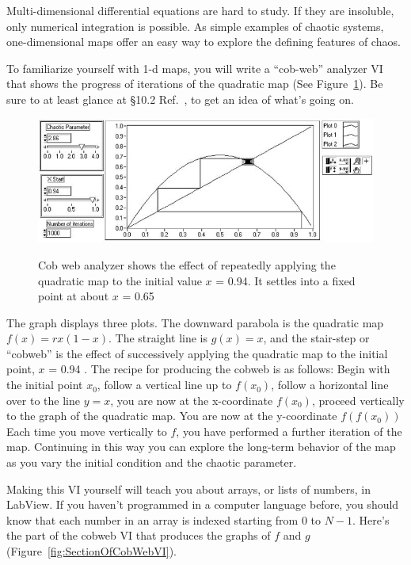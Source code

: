 \documentclass{../lab}
\begin{document}
Multi-dimensional differential equations are hard to study. If they are insoluble, only numerical integration is possible. As simple examples of chaotic systems, one-dimensional maps offer an easy way to explore the defining features of chaos.

To familiarize yourself with 1-d maps, you will write a ``cob-web'' analyzer VI that shows the progress of iterations of the quadratic map (See Figure~\ref{fig:CobWebAnalyzer}). Be sure to at least glance at \S10.2 Ref.~\cite{Strogatz}, to get an idea of what's going on.

\begin{figure}[h]
    \centering
    \href{http://experimentationlab.berkeley.edu/sites/default/files/images/Nldimage070.jpg}{\includegraphics[width=0.65\linewidth]{images/Nldimage070.jpg}}
    \caption{Cob web analyzer shows the effect of repeatedly applying the quadratic map to the initial value $x$ = 0.94. It settles into a fixed point at about $x$ = 0.65}
    \label{fig:CobWebAnalyzer}
\end{figure}

The graph displays three plots. The downward parabola is the quadratic map $f(x) = rx(1-x)$. The straight line is $g(x) = x$, and the stair-step or ``cobweb'' is the effect of successively applying the quadratic map to the initial point, $x$ = 0.94 . The recipe for producing the cobweb is as follows: Begin with the initial point $x_0$, follow a vertical line up to $f(x_0)$, follow a horizontal line over to the line $y = x$, you are now at the x-coordinate $f(x_0)$, proceed vertically to the graph of the quadratic map. You are now at the y-coordinate $f(f(x_0))$ Each time you move vertically to $f$, you have performed a further iteration of the map. Continuing in this way you can explore the long-term behavior of the map as you vary the initial condition and the chaotic parameter.

Making this VI yourself will teach you about arrays, or lists of numbers, in LabView. If you haven't programmed in a computer language before, you should know that each number in an array is indexed starting from 0 to $N-1$. Here's the part of the cobweb VI that produces the graphs of $f$ and $g$ (Figure~\ref{fig:SectionOfCobWebVI}).
\end{document}
